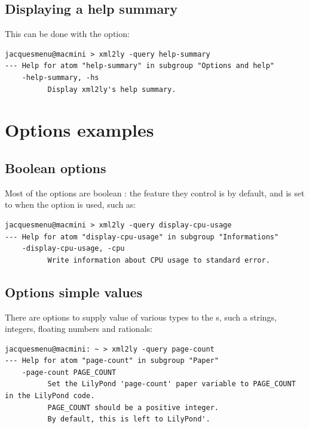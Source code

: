\section{Displaying a help summary}

This can be done with the  option:
\begin{lstlisting}[language=Terminal]
jacquesmenu@macmini > xml2ly -query help-summary
--- Help for atom "help-summary" in subgroup "Options and help"
    -help-summary, -hs
          Display xml2ly's help summary.
\end{lstlisting}


\chapter{Options examples}\label{Options examples}

\section{Boolean options}\label{Boolean options}

Most of the options are boolean : the feature they control is  by default, and is set to  when the option is used, such as:
\begin{lstlisting}[language=CPlusPlus]
jacquesmenu@macmini > xml2ly -query display-cpu-usage
--- Help for atom "display-cpu-usage" in subgroup "Informations"
    -display-cpu-usage, -cpu
          Write information about CPU usage to standard error.
\end{lstlisting}

\section{Options simple values}\label{Options simple values}

There are options to supply value of various types to the \service s, such a strings, integers, floating numbers and rationals:
\begin{lstlisting}[language=Terminal]
jacquesmenu@macmini: ~ > xml2ly -query page-count
--- Help for atom "page-count" in subgroup "Paper"
    -page-count PAGE_COUNT
          Set the LilyPond 'page-count' paper variable to PAGE_COUNT in the LilyPond code.
          PAGE_COUNT should be a positive integer.
          By default, this is left to LilyPond'.
\end{lstlisting}

